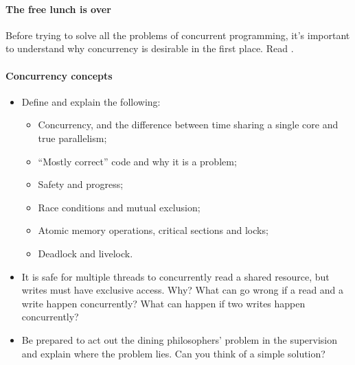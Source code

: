 \documentclass[12pt,a4paper,oneside,openright]{report}
\newcommand{\question}[2]{\paragraph{#1} #2}
\begin{document}
\question{The free lunch is over}{Before trying to solve all the
  problems of concurrent programming, it's important to understand why
  concurrency is desirable in the first place. Read
  \cite{FreeLunchIsOver}.}

\question{Concurrency concepts}{
  \begin{itemize}
  \item Define and explain the following:
    \begin{itemize}
    \item Concurrency, and the difference between time sharing a single
      core and true parallelism;
    \item ``Mostly correct'' code and why it is a problem;
    \item Safety and progress;
    \item Race conditions and mutual exclusion;
    \item Atomic memory operations, critical sections and locks;
    \item Deadlock and livelock.
    \end{itemize}
  \item It is safe for multiple threads to concurrently read a shared
    resource, but writes must have exclusive access. Why?  What can go
    wrong if a read and a write happen concurrently?  What can happen
    if two writes happen concurrently?
  \item Be prepared to act out the dining philosophers' problem in the
    supervision and explain where the problem lies. Can you think of a
    simple solution?
  \end{itemize}
}
\end{document}
